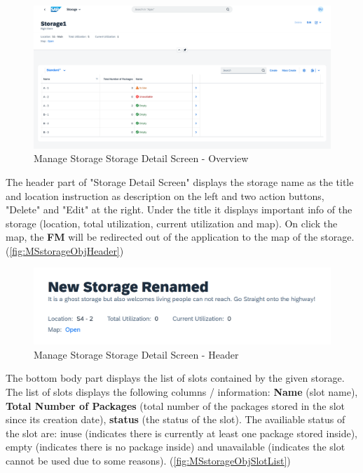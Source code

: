\begin{figure}[H]
	\centering
	\includegraphics[width=1\linewidth]{images/user_doc/storage/StorageReportPage/storageObjWithSlots.png}
	\caption{Manage Storage Storage Detail Screen - Overview}
	\label{fig:MSdetailOVerview}
\end{figure}

The header part of "Storage Detail Screen" displays the storage name as the title and location instruction as description on the left and two action buttons, "Delete" and "Edit" at the right.
Under the title it displays important info of the storage (location, total utilization, current utilization and map). On click the map, the \textbf{FM} will be redirected out of the application to the map of the storage.
(\autoref{fig:MSstorageObjHeader})

\begin{figure}[H] %
	\centering
	\includegraphics[width=1\linewidth]{images/user_doc/storage/StorageObjectPage/StorageObjHeader.png}
	\caption{Manage Storage Storage Detail Screen - Header}
	\label{fig:MSstorageObjHeader}
\end{figure}

The bottom body part displays the list of slots contained by the given storage. The list of slots displays the following columns / information: \textbf{Name} (slot name), \textbf{Total Number of Packages} (total number of the packages stored in the slot since its creation date), \textbf{status} (the status of the slot). The availiable status of the slot are: inuse (indicates there is currently at least one package stored inside), empty (indicates there is no package inside) and unavailable (indicates the slot cannot be used due to some reasons).
(\autoref{fig:MSstorageObjSlotList})

